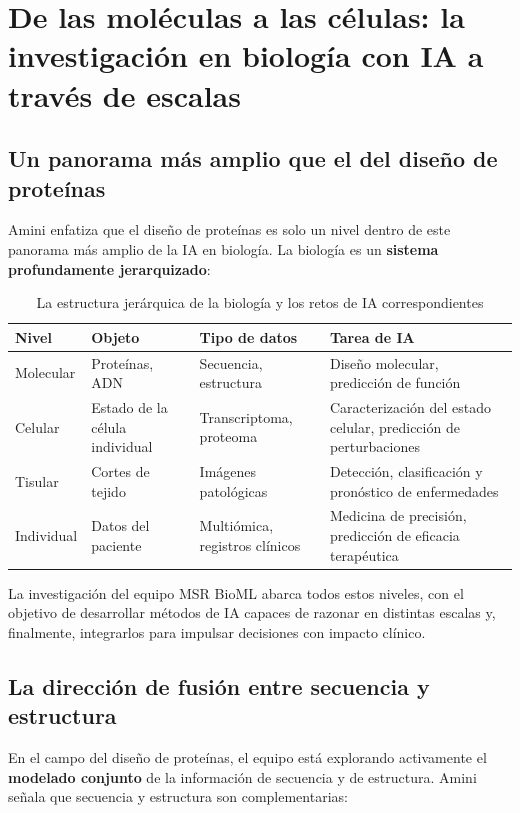 \section{De las moléculas a las células: la investigación en biología con IA a través de escalas}

\subsection{Un panorama más amplio que el del diseño de proteínas}

Amini enfatiza que el diseño de proteínas es solo un nivel dentro de este panorama más amplio de la IA en biología. La biología es un \textbf{sistema profundamente jerarquizado}:

\begin{table}[H]
\centering
\caption{La estructura jerárquica de la biología y los retos de IA correspondientes}
\begin{tabular}{@{}llll@{}}
\toprule
\textbf{Nivel} & \textbf{Objeto} & \textbf{Tipo de datos} & \textbf{Tarea de IA} \\
\midrule
Molecular & Proteínas, ADN & Secuencia, estructura & Diseño molecular, predicción de función \\
Celular & Estado de la célula individual & Transcriptoma, proteoma & Caracterización del estado celular, predicción de perturbaciones \\
Tisular & Cortes de tejido & Imágenes patológicas & Detección, clasificación y pronóstico de enfermedades \\
Individual & Datos del paciente & Multiómica, registros clínicos & Medicina de precisión, predicción de eficacia terapéutica \\
\bottomrule
\end{tabular}
\end{table}

La investigación del equipo MSR BioML abarca todos estos niveles, con el objetivo de desarrollar métodos de IA capaces de razonar en distintas escalas y, finalmente, integrarlos para impulsar decisiones con impacto clínico.

\subsection{La dirección de fusión entre secuencia y estructura}

En el campo del diseño de proteínas, el equipo está explorando activamente el \textbf{modelado conjunto} de la información de secuencia y de estructura. Amini señala que secuencia y estructura son complementarias:

